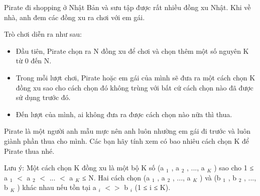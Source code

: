 Pirate đi shopping ở Nhật Bản và sưu tập được rất nhiều đồng xu Nhật. Khi về nhà, anh đem các đồng xu ra chơi với em gái.  

   Trò chơi diễn ra như sau:  
\begin{itemize}
	\item     Đầu tiên, Pirate chọn ra N đồng xu để chơi và chọn thêm một số nguyên K từ 0 đến N.   
	\item     Trong mỗi lượt chơi, Pirate hoặc em gái của mình sẽ đưa ra một cách chọn K đồng xu sao cho cách chọn đó không trùng với bất cứ cách chọn nào đã được sử dụng trước đó.   
	\item     Đến lượt của mình, ai không đưa ra được cách chọn nào nữa thì thua.   
\end{itemize}

   Pirate là một người anh mẫu mực nên anh luôn nhường em gái đi trước và luôn giành phần thua cho mình. Các bạn hãy tính xem có bao nhiêu cách chọn K để Pirate thua nhé.  

   Lưu ý: Một cách chọn K đồng xu là một bộ K số (a   $_    1   $   , a   $_    2   $   , ..., a   $_    K   $   ) sao cho 1 ≤ a   $_    1   $   $<$ a   $_    2   $   $<$ ... $<$ a   $_    K   $   ≤ N. Hai cách chọn (a   $_    1   $   , a   $_    2   $   , ..., a   $_    K   $   ) và (b   $_    1   $   , b   $_    2   $   , ..., b   $_    K   $   ) khác nhau nếu tồn tại a   $_    i   $   $<$$>$ b   $_    i   $   (1 ≤ i ≤ K).